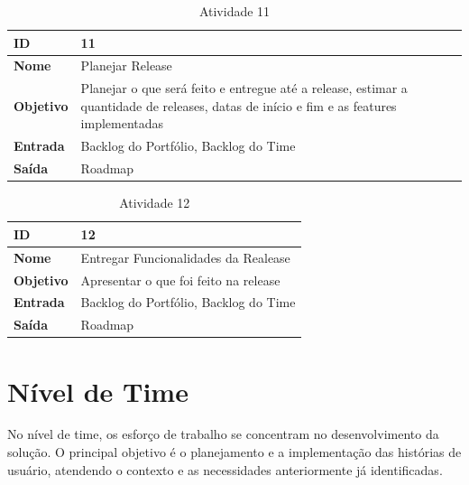 \begin{table}[!h]
	\centering
	\caption{Atividade 11}
	\label{my-label}
	\begin{tabular}{|l|l|}
	\hline
	\textbf{ID}       & 11                                                                                                                                      \\ \hline
	\textbf{Nome}     & Planejar Release                                                                                                                        \\ \hline
	\textbf{Objetivo} &\parbox[t]{7cm}{Planejar o que será feito e entregue até a release, estimar a quantidade de releases, datas de início e fim e as features implementadas} \\ \hline
	\textbf{Entrada}  & Backlog do Portfólio, Backlog do Time                                                                                                   \\ \hline
	\textbf{Saída}    & Roadmap                                                                                                                                 \\ \hline
	\end{tabular}
\end{table}

\begin{table}[!h]
	\centering
	\caption{Atividade 12}
	\label{my-label}
	\begin{tabular}{|l|l|}
	\hline
	\textbf{ID}       & 12                                    \\ \hline
	\textbf{Nome}     & Entregar Funcionalidades da Realease  \\ \hline
	\textbf{Objetivo} & Apresentar o que foi feito na release \\ \hline
	\textbf{Entrada}  & Backlog do Portfólio, Backlog do Time \\ \hline
	\textbf{Saída}    & Roadmap                               \\ \hline
	\end{tabular}
\end{table}


\section{Nível de Time}
No nível de time, os esforço de trabalho se concentram no desenvolvimento da solução. O principal objetivo é o planejamento
e a implementação das histórias de usuário, atendendo o contexto e as necessidades anteriormente já identificadas.


